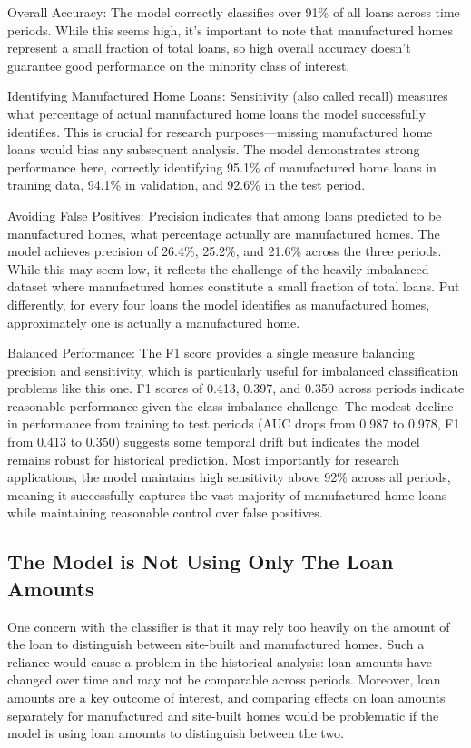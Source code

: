 \documentclass[11pt]{article}
\begin{document}
Overall Accuracy: The model correctly classifies over 91\% of all loans across time periods. While this seems high, it's important to note that manufactured homes represent a small fraction of total loans, so high overall accuracy doesn't guarantee good performance on the minority class of interest.

Identifying Manufactured Home Loans: Sensitivity (also called recall) measures what percentage of actual manufactured home loans the model successfully identifies. This is crucial for research purposes—missing manufactured home loans would bias any subsequent analysis. The model demonstrates strong performance here, correctly identifying 95.1\% of manufactured home loans in training data, 94.1\% in validation, and 92.6\% in the test period.

Avoiding False Positives: Precision indicates that among loans predicted to be manufactured homes, what percentage actually are manufactured homes. The model achieves precision of 26.4\%, 25.2\%, and 21.6\% across the three periods. While this may seem low, it reflects the challenge of the heavily imbalanced dataset where manufactured homes constitute a small fraction of total loans. Put differently, for every four loans the model identifies as manufactured homes, approximately one is actually a manufactured home.

Balanced Performance: The F1 score provides a single measure balancing precision and sensitivity, which is particularly useful for imbalanced classification problems like this one. F1 scores of 0.413, 0.397, and 0.350 across periods indicate reasonable performance given the class imbalance challenge.
The modest decline in performance from training to test periods (AUC drops from 0.987 to 0.978, F1 from 0.413 to 0.350) suggests some temporal drift but indicates the model remains robust for historical prediction. Most importantly for research applications, the model maintains high sensitivity above 92\% across all periods, meaning it successfully captures the vast majority of manufactured home loans while maintaining reasonable control over false positives.

\subsection{The Model is Not Using Only The Loan Amounts}

One concern with the classifier is that it may rely too heavily on the amount of the loan to distinguish between site-built and manufactured homes. Such a reliance would cause a problem in the historical analysis: loan amounts have changed over time and may not be comparable across periods. Moreover, loan amounts are a key outcome of interest, and comparing effects on loan amounts separately for manufactured and site-built homes would be problematic if the model is using loan amounts to distinguish between the two.
\end{document}
